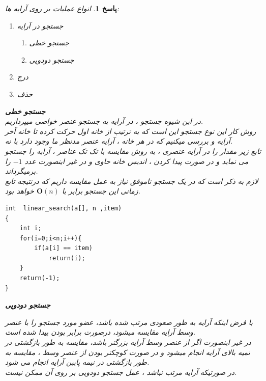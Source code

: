 \documentclass[12pt]{article}
\newtheorem{answer}{پاسخ}[section]
\begin{document}
\begin{answer}
انواع عملیات بر روی آرایه ها:
\begin{enumerate}
\item جستجو در آرایه 
	\begin{enumerate}
			\item 
			جستجو خطی 
			\item 
جستجو دودویی  
	\end{enumerate}
\item 
	درج 
\item 
	حذف
\end{enumerate}
\newline

\textbf{جستجو خطی }\\

\noindent
در این شیوه جستجو ، در آرایه به جستجو عنصر خواصی میپردازیم.\\
روش کار این نوع جستجو این است که به ترتیب از خانه اول حرکت کرده تا خانه آخر  آرایه و بررسی میکنیم که در هر خانه ، آرایه عنصر مدنظر ما وجود دارد یا نه.\\
تابع زیر مقدار  را در آرایه  عنصری  ، به روش مقایسه با تک تک عناصر ، آرایه را جستجو می نماید و در صورت پیدا کردن ، اندیس خانه حاوی   و در غیر اینصورت عدد $-1$ را برمیگرداند.\\
لازم به ذکر است که در یک جستجو ناموفق نیاز به 
عمل مقایسه داریم که درنتیجه تابع زمانی این جستجو برابر با
$\mathbf{O}(n)$
خواهد بود.\\


\begin{latin}
\begin{lstlisting}
int  linear_search(a[], n ,item)
{	
	int i;
	for(i=0;i<n;i++){
		if(a[i] == item)
			return(i);	
	}
	return(-1);
}
\end{lstlisting}
\end{latin}

\newpage

\textbf{جستجو دودویی }

با فرض اینکه آرایه به طور صعودی مرتب شده باشد، عضو مورد جستجو را با عنصر وسط آرایه مقایسه میشود، درصورت برابر بودن پیدا شده است.\\
در غیر اینصورت اگر از عنصر وسط آرایه بزرگتر باشد، مقایسه به طور بازگشتی در نمیه بالای آرایه انجام میشود و در صورت کوچکتر بودن از عنصر وسط ، مقایسه به طور بازگشتی در نیمه پایین آرایه انجام می شود.\\

در صورتیکه آرایه مرتب نباشد ، عمل جستجو دودویی بر روی آن ممکن نیست.\\


\end{answer}
\end{document}
